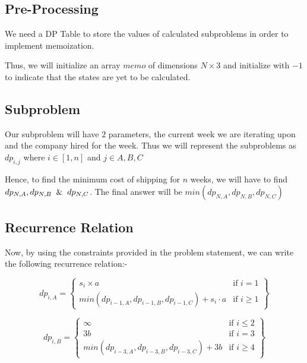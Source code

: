 \documentclass{article}
\begin{document}
\subsection{Pre-Processing}

We need a DP Table to store the values of calculated subproblems in order to implement memoization. 

Thus, we will initialize an array $memo$ of dimensions $N \times 3$ and initialize with $-1$ to indicate that the states are yet to be calculated.

\subsection{Subproblem}

Our subproblem will have $2$ parameters, the current week we are iterating upon and the company hired for the week. Thus we will represent the subproblems as $dp_{i, j}$ where $i \in [1, n]$ and $j \in {A, B, C}$

Hence, to find the minimum cost of shipping for $n$ weeks, we will have to find $dp_{N, A}, dp_{N, B} \And dp_{N, C}$. The final answer will be $min(dp_{N, A}, dp_{N, B}, dp_{N, C})$

\subsection{Recurrence Relation}

Now, by using the constraints provided in the problem statement, we can write the following recurrence relation:-

\begin{equation}
dp_{i, A} = 
\left\{
    \begin{array}{lr}
        s_i \times a & \text{if } i = 1\\
        min(dp_{i - 1, A}, dp_{i - 1, B}, dp_{i - 1, C}) + s_i \cdot a & \text{if } i\geq 1
    \end{array}
\right\}
\end{equation}

\begin{equation}
dp_{i, B} = 
\left\{
    \begin{array}{lr}
        \infty & \text{if } i \leq 2\\
        3b & \text{if } i = 3\\
        min(dp_{i - 3, A}, dp_{i - 3, B}, dp_{i - 3, C}) + 3b & \text{if } i\geq 4
    \end{array}
\right\}
\end{equation}
\end{document}

